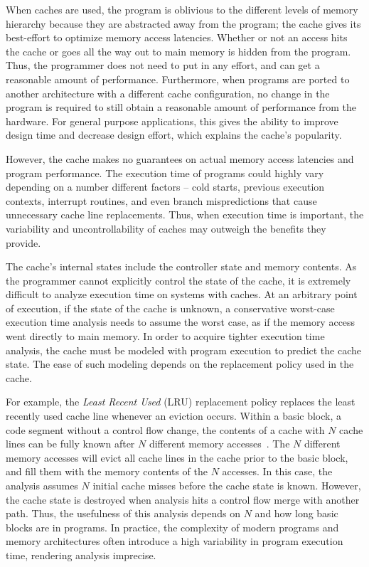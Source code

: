 When caches are used, the program is oblivious to the different levels of memory hierarchy because they are abstracted away from the program; the cache gives its best-effort to optimize memory access latencies.
Whether or not an access hits the cache or goes all the way out to main memory is hidden from the program.
Thus, the programmer does not need to put in any effort, and can get a reasonable amount of performance. 
Furthermore, when programs are ported to another architecture with a different cache configuration, no change in the program is required to still obtain a reasonable amount of performance from the hardware.   
For general purpose applications, this gives the ability to improve design time and decrease design effort, which explains the cache's popularity. 

However, the cache makes no guarantees on actual memory access latencies and program performance. 
The execution time of programs could highly vary depending on a number different factors -- cold starts, previous execution contexts, interrupt routines, and even branch mispredictions that cause unnecessary cache line replacements.  
Thus, when execution time is important, the variability and uncontrollability of caches may outweigh the benefits they provide. 

The cache's internal states include the controller state and memory contents. 
As the programmer cannot explicitly control the state of the cache, it is extremely difficult to analyze execution time on systems with caches.
At an arbitrary point of execution, if the state of the cache is unknown, a conservative worst-case execution time analysis needs to assume the worst case, as if the memory access went directly to main memory.
In order to acquire tighter execution time analysis, the cache must be modeled with program execution to predict the cache state.
The ease of such modeling depends on the replacement policy used in the cache.

For example, the \emph{Least Recent Used} (LRU) replacement policy replaces the least recently used cache line whenever an eviction occurs. 
Within a basic block, a code segment without a control flow change, the contents of a cache with $N$ cache lines can be fully known after $N$ different memory accesses~\cite{Heckmann2003processor}.  
The $N$ different memory accesses will evict all cache lines in the cache prior to the basic block, and fill them with the memory contents of the $N$ accesses. 
In this case, the analysis assumes $N$ initial cache misses before the cache state is known.
However, the cache state is destroyed when analysis hits a control flow merge with another path.
Thus, the usefulness of this analysis depends on $N$ and how long basic blocks are in programs.  
In practice, the complexity of modern programs and memory architectures often introduce a high variability in program execution time, rendering analysis imprecise. 

